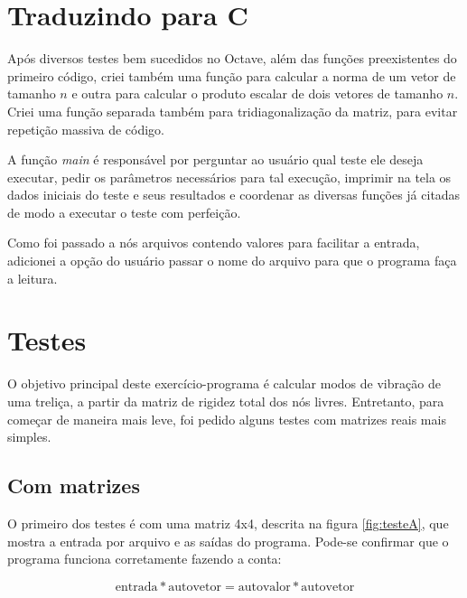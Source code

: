 \documentclass[12pt]{article} %
\begin{document}
            \vspace{\baselineskip}
            
    \section{Traduzindo para C}
        
        Após diversos testes bem sucedidos no Octave, além das funções preexistentes do primeiro código, criei também uma função para calcular a norma de um vetor de tamanho $n$ e outra para calcular o produto escalar de dois vetores de tamanho $n$. Criei uma função separada também para tridiagonalização da matriz, para evitar repetição massiva de código.
        
        A função \textit{main} é responsável por perguntar ao usuário qual teste ele deseja executar, pedir os parâmetros necessários para tal execução, imprimir na tela os dados iniciais do teste e seus resultados e coordenar as diversas funções já citadas de modo a executar o teste com perfeição.
        
        Como foi passado a nós arquivos contendo valores para facilitar a entrada, adicionei a opção do usuário passar o nome do arquivo para que o programa faça a leitura.
        
        \vspace{\baselineskip}
        
    \section{Testes}
        
        O objetivo principal deste exercício-programa é calcular modos de vibração de uma treliça, a partir da matriz de rigidez total dos nós livres. Entretanto, para começar de maneira mais leve, foi pedido alguns testes com matrizes reais mais simples.
        
        \subsection{Com matrizes}
            
            O primeiro dos testes é com uma matriz 4x4, descrita na figura \ref{fig:testeA}, que mostra a entrada por arquivo e as saídas do programa. Pode-se confirmar que o programa funciona corretamente fazendo a conta:
            
            $$ \text{entrada}*\text{autovetor} = \text{autovalor}*\text{autovetor} $$
            
\end{document}
